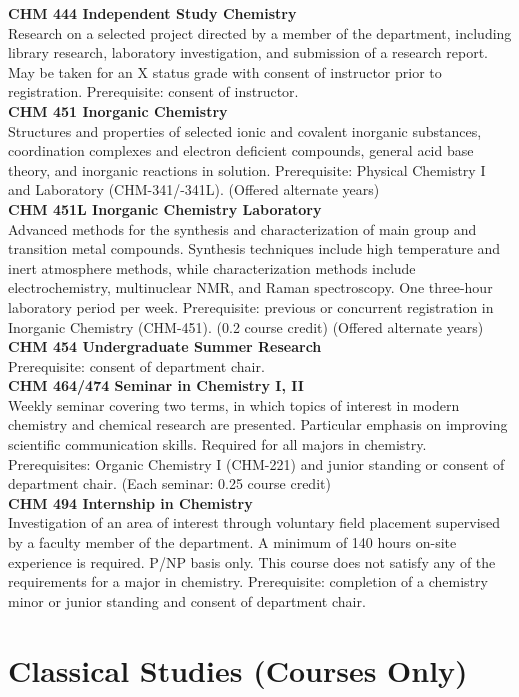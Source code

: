 \documentclass[
  letterpaper,
]{scrbook}
\begin{document}
\textbf{CHM 444 Independent Study Chemistry}\\
Research on a selected project directed by a member of the department,
including library research, laboratory investigation, and submission of
a research report. May be taken for an X status grade with consent of
instructor prior to registration. Prerequisite: consent of instructor.\\
\textbf{CHM 451 Inorganic Chemistry}\\
Structures and properties of selected ionic and covalent inorganic
substances, coordination complexes and electron deficient compounds,
general acid base theory, and inorganic reactions in solution.
Prerequisite: Physical Chemistry I and Laboratory (CHM-341/-341L).
(Offered alternate years)\\
\textbf{CHM 451L Inorganic Chemistry Laboratory}\\
Advanced methods for the synthesis and characterization of main group
and transition metal compounds. Synthesis techniques include high
temperature and inert atmosphere methods, while characterization methods
include electrochemistry, multinuclear NMR, and Raman spectroscopy. One
three-hour laboratory period per week. Prerequisite: previous or
concurrent registration in Inorganic Chemistry (CHM-451). (0.2 course
credit) (Offered alternate years)\\
\textbf{CHM 454 Undergraduate Summer Research}\\
Prerequisite: consent of department chair.\\
\textbf{CHM 464/474 Seminar in Chemistry I, II}\\
Weekly seminar covering two terms, in which topics of interest in modern
chemistry and chemical research are presented. Particular emphasis on
improving scientific communication skills. Required for all majors in
chemistry. Prerequisites: Organic Chemistry I (CHM-221) and junior
standing or consent of department chair. (Each seminar: 0.25 course
credit)\\
\textbf{CHM 494 Internship in Chemistry}\\
Investigation of an area of interest through voluntary field placement
supervised by a faculty member of the department. A minimum of 140 hours
on-site experience is required. P/NP basis only. This course does not
satisfy any of the requirements for a major in chemistry. Prerequisite:
completion of a chemistry minor or junior standing and consent of
department chair.

\section{Classical Studies (Courses
Only)}\label{classical-studies-courses-only}
\end{document}
